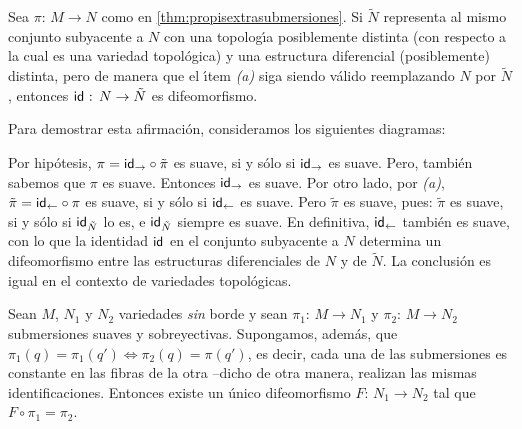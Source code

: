 \begin{obsCaracterizaSubmersionesSobre}\label{obs:caracterizasubmersionessobre}
	Sea $\pi:\,M\rightarrow N$ como en \ref{thm:propisextrasubmersiones}.
	Si $\tilde{N}$ representa al mismo conjunto subyacente a $N$ con
	una topolog\'{\i}a posiblemente distinta (con respecto a la cual
	es una variedad topol\'{o}gica) y una estructura diferencial
	(posiblemente) distinta, pero de manera que el \'{\i}tem
	\emph{(a)} siga siendo v\'{a}lido reemplazando $N$ por $\tilde{N}$,
	entonces $\id:\,N\rightarrow\tilde{N}$ es difeomorfismo.

	Para demostrar esta afirmaci\'{o}n, consideramos los siguientes
	diagramas:
	\begin{center}
	\end{center}

	Por hip\'{o}tesis, $\pi=\id[\rightarrow]\circ\tilde{\pi}$ es suave, si
	y s\'{o}lo si $\id[\rightarrow]$ es suave. Pero, tambi\'{e}n sabemos
	que $\pi$ es suave. Entonces $\id[\rightarrow]$ es suave. Por otro
	lado, por \emph{(a)}, $\tilde{\pi}=\id[\leftarrow]\circ\pi$ es suave,
	si y s\'{o}lo si $\id[\leftarrow]$ es suave. Pero $\tilde{\pi}$ es
	suave, pues: $\tilde{\pi}$ es suave, si y s\'{o}lo si $\id[\tilde{N}]$
	lo es, e $\id[\tilde{N}]$ siempre es suave. En definitiva,
	$\id[\leftarrow]$ tambi\'{e}n es suave, con lo que la identidad $\id$
	en el conjunto subyacente a $N$ determina un difeomorfismo entre las
	estructuras diferenciales de $N$ y de $\tilde{N}$. La conclusi\'{o}n
	es igual en el contexto de variedades topol\'{o}gicas.
\end{obsCaracterizaSubmersionesSobre}

\begin{coroUnicidadDelCociente}\label{thm:unicidaddelcociente}
	Sean $M$, $N_{1}$ y $N_{2}$ variedades \emph{sin} borde y sean
	$\pi_{1}:\,M\rightarrow N_{1}$ y $\pi_{2}:\,M\rightarrow N_{2}$
	submersiones suaves y sobreyectivas. Supongamos, adem\'{a}s, que
	$\pi_{1}(q)=\pi_{1}(q')\Leftrightarrow\pi_{2}(q)=\pi(q')$, es decir,
	cada una de las submersiones es constante en las fibras de la otra
	--dicho de otra manera, realizan las mismas identificaciones. Entonces
	existe un \'{u}nico difeomorfismo $F:\,N_{1}\rightarrow N_{2}$
	tal que $F\circ\pi_{1}=\pi_{2}$.
\end{coroUnicidadDelCociente}


